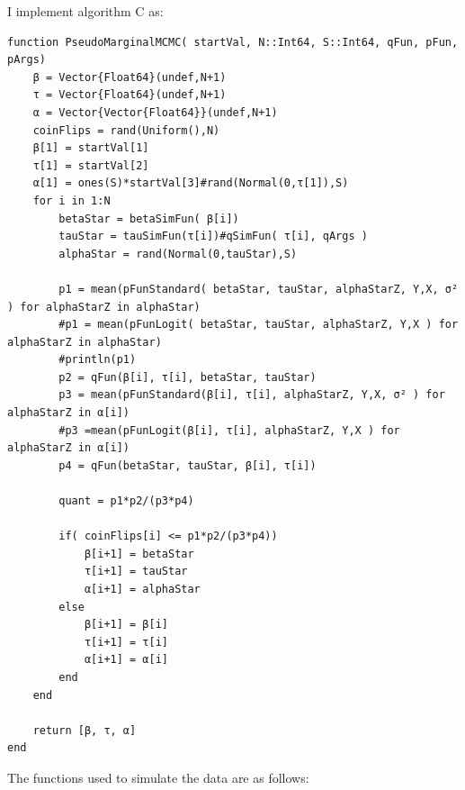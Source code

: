 \documentclass[12pt]{paper}
\begin{document}
I implement algorithm C as:

\begin{verbatim}
function PseudoMarginalMCMC( startVal, N::Int64, S::Int64, qFun, pFun, pArgs)
    β = Vector{Float64}(undef,N+1)
    τ = Vector{Float64}(undef,N+1)
    α = Vector{Vector{Float64}}(undef,N+1)
    coinFlips = rand(Uniform(),N)
    β[1] = startVal[1]
    τ[1] = startVal[2]
    α[1] = ones(S)*startVal[3]#rand(Normal(0,τ[1]),S)
    for i in 1:N
        betaStar = betaSimFun( β[i])
        tauStar = tauSimFun(τ[i])#qSimFun( τ[i], qArgs )
        alphaStar = rand(Normal(0,tauStar),S)

        p1 = mean(pFunStandard( betaStar, tauStar, alphaStarZ, Y,X, σ² ) for alphaStarZ in alphaStar)
        #p1 = mean(pFunLogit( betaStar, tauStar, alphaStarZ, Y,X ) for alphaStarZ in alphaStar)
        #println(p1)
        p2 = qFun(β[i], τ[i], betaStar, tauStar)
        p3 = mean(pFunStandard(β[i], τ[i], alphaStarZ, Y,X, σ² ) for alphaStarZ in α[i])
        #p3 =mean(pFunLogit(β[i], τ[i], alphaStarZ, Y,X ) for alphaStarZ in α[i])
        p4 = qFun(betaStar, tauStar, β[i], τ[i])

        quant = p1*p2/(p3*p4)
        
        if( coinFlips[i] <= p1*p2/(p3*p4))
            β[i+1] = betaStar
            τ[i+1] = tauStar
            α[i+1] = alphaStar
        else
            β[i+1] = β[i]
            τ[i+1] = τ[i]
            α[i+1] = α[i]
        end
    end

    return [β, τ, α]
end
\end{verbatim}

The functions used to simulate the data are as follows:
\end{document}
